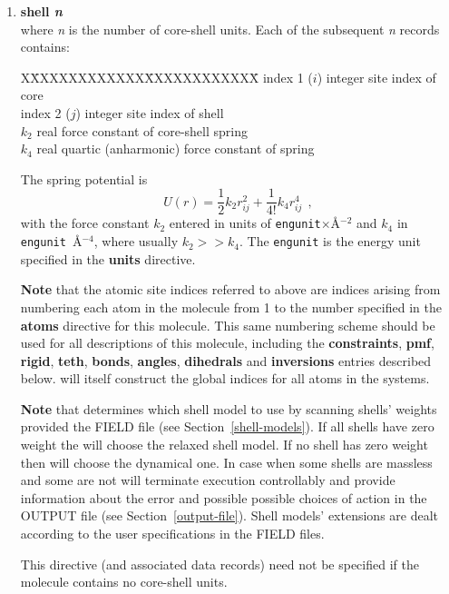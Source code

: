 \begin{enumerate}
\item{\bf shell {\em n}} \\
where {\em n} is the number of core-shell units.  Each of the
subsequent {\em n} records contains:
\begin{tabbing}
X\=XXXXXXXXXXXX\=XXXXXXXXXXXX\=\kill
\> index 1 ($i$) \> integer \> site index of core \\
\> index 2 ($j$) \> integer \> site index of shell \\
\> $k_{2}$       \> real    \> force constant of core-shell spring \\
\> $k_{4}$       \> real    \> quartic (anharmonic) force constant of spring
\end{tabbing}
The spring potential is
\begin{equation}
U(r)=\frac{1}{2}k_{2} r_{ij}^{2}+\frac{1}{4!}k_{4} r_{ij}^{4}~~,
\end{equation}
with the force constant $k_{2}$ entered in units of {\tt engunit}$\times$\AA$^{-2}$
and $k_{4}$ in {\tt engunit}~\AA$^{-4}$, where usually $k_{2} >> k_{4}$.
The {\tt engunit} is the energy unit specified in the {\bf units} directive.

{\bf Note} that the atomic site indices referred to above are
indices arising from numbering each atom in the molecule from 1 to
the number specified in the {\bf atoms} directive for this
molecule.  This same numbering scheme should be used for all
descriptions of this molecule, including the {\bf constraints},
{\bf pmf}, {\bf rigid}, {\bf teth}, {\bf bonds}, {\bf angles},
{\bf dihedrals} and {\bf inversions} entries described below.
\D will itself construct the global indices for all atoms in the systems.

{\bf Note} that \D determines which shell model to use by scanning
shells' weights provided the FIELD file (see Section~\ref{shell-models}).
If all shells have zero weight the \D will choose the relaxed shell
model.  If no shell has zero weight then \D will choose the dynamical
one.  In case when some shells are massless and some are not \D will
terminate execution controllably and provide information about the
error and possible possible choices of action in the OUTPUT file
(see Section~\ref{output-file}).  Shell models' extensions are dealt
according to the user specifications in the FIELD files.

This directive (and associated data records) need not be specified if
the molecule contains no core-shell units.


\end{enumerate}
